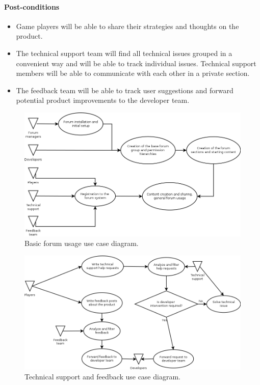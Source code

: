 \documentclass[12pt]{report}
\begin{document}
                        \paragraph{Post-conditions}
                            \begin{itemize}
                                \item Game players will be able to share their strategies and thoughts on the product.
                                \item The technical support team will find all technical issues grouped in a convenient way and will be able to track individual issues. Technical support members will be able to communicate with each other in a private section.
                                \item The feedback team will be able to track user suggestions and forward potential product improvements to the developer team.
                            \end{itemize}

                        \begin{figure}[!htb]
                        \caption{Basic forum usage use case diagram.}
                        \centering
                        \includegraphics[width=1\textwidth]{uc/uc1}
                        \end{figure}

                        \begin{figure}[!htb]
                        \caption{Technical support and feedback use case diagram.}
                        \centering
                        \includegraphics[width=1\textwidth]{uc/uc2}
                        \end{figure}
\end{document}
